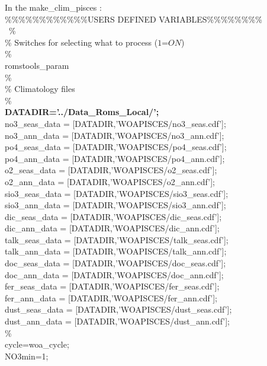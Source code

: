 \noindent In the make\_clim\_pisces :
\\
\%\%\%\%\%\%\%\%\%\%\%\%USERS DEFINED VARIABLES\%\%\%\%\%\%\%\%\\\
\%\\
\%  Switches for selecting what to process ($1$=$ON$)\\
\%\\
romstools\_param\\
\%\\
\% Climatology files\\
\%\\
\textbf{DATADIR='../Data\_Roms\_Local/';}\\
no3\_seas\_data  = [DATADIR,'WOAPISCES/no3\_seas.cdf'];\\
no3\_ann\_data   = [DATADIR,'WOAPISCES/no3\_ann.cdf'];\\
po4\_seas\_data  = [DATADIR,'WOAPISCES/po4\_seas.cdf'];\\
po4\_ann\_data   = [DATADIR,'WOAPISCES/po4\_ann.cdf'];\\
o2\_seas\_data   = [DATADIR,'WOAPISCES/o2\_seas.cdf'];\\
o2\_ann\_data    = [DATADIR,'WOAPISCES/o2\_ann.cdf'];\\
sio3\_seas\_data = [DATADIR,'WOAPISCES/sio3\_seas.cdf'];\\
sio3\_ann\_data  = [DATADIR,'WOAPISCES/sio3\_ann.cdf'];\\
dic\_seas\_data  = [DATADIR,'WOAPISCES/dic\_seas.cdf'];\\
dic\_ann\_data   = [DATADIR,'WOAPISCES/dic\_ann.cdf'];\\
talk\_seas\_data = [DATADIR,'WOAPISCES/talk\_seas.cdf'];\\
talk\_ann\_data  = [DATADIR,'WOAPISCES/talk\_ann.cdf'];\\
doc\_seas\_data  = [DATADIR,'WOAPISCES/doc\_seas.cdf'];\\
doc\_ann\_data   = [DATADIR,'WOAPISCES/doc\_ann.cdf'];\\
fer\_seas\_data  = [DATADIR,'WOAPISCES/fer\_seas.cdf'];\\
fer\_ann\_data   = [DATADIR,'WOAPISCES/fer\_ann.cdf'];\\
dust\_seas\_data = [DATADIR,'WOAPISCES/dust\_seas.cdf'];\\
dust\_ann\_data  = [DATADIR,'WOAPISCES/dust\_ann.cdf'];\\
\%\\
cycle=woa\_cycle;\\
NO3min=1;\\



